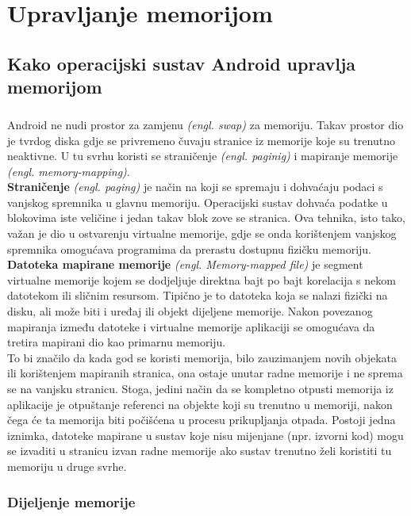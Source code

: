 \documentclass[times, utf8, zavrsni]{fer}
\begin{document}
\chapter{Upravljanje memorijom}
\section{Kako operacijski sustav Android upravlja memorijom}
\paragraph{}
Android ne nudi prostor za zamjenu \textit{(engl. swap)} za memoriju. Takav prostor dio je tvrdog diska gdje se privremeno čuvaju stranice iz memorije koje su trenutno neaktivne. U tu svrhu koristi se straničenje \textit{(engl. paginig)} i mapiranje memorije \textit{(engl. memory-mapping)}.\\

\textbf{Straničenje} \textit{(engl. paging)} je način na koji se spremaju i dohvaćaju podaci s vanjskog spremnika u glavnu memoriju. Operacijski sustav dohvaća podatke u blokovima iste veličine i jedan takav blok zove se stranica. Ova tehnika, isto tako, važan je dio u ostvarenju virtualne memorije, gdje se onda korištenjem vanjskog spremnika omogućava programima da prerastu dostupnu fizičku memoriju.\\

\textbf{Datoteka mapirane memorije} \textit{(engl. Memory-mapped file)} je segment virtualne memorije kojem se dodjeljuje direktna bajt po bajt korelacija s nekom datotekom ili sličnim resursom. Tipično je to datoteka koja se nalazi fizički na disku, ali može biti i uređaj ili objekt dijeljene memorije. Nakon povezanog mapiranja između datoteke i virtualne memorije aplikaciji se omogućava da tretira mapirani dio kao primarnu memoriju.\\

To bi značilo da kada god se koristi memorija, bilo zauzimanjem novih objekata ili korištenjem mapiranih stranica, ona ostaje unutar radne memorije i ne sprema se na vanjsku stranicu. Stoga, jedini način da se kompletno otpusti memorija iz aplikacije je otpuštanje referenci na objekte koji su trenutno u memoriji, nakon čega će ta memorija biti počišćena u procesu prikupljanja otpada. Postoji jedna iznimka, datoteke mapirane u sustav koje nisu mijenjane (npr. izvorni kod) mogu se izvaditi u stranicu izvan radne memorije ako sustav trenutno želi koristiti tu memoriju u druge svrhe.

\subsection{Dijeljenje memorije}
\end{document}
